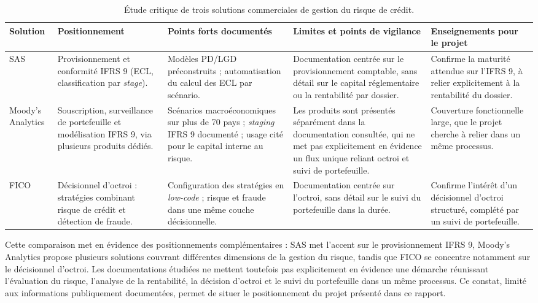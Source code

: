 \begin{table}[htbp]
    \centering
    \footnotesize
    \caption{Étude critique de trois solutions commerciales de gestion du risque de crédit.}
    \label{tab:etude-existant}
    \begin{tabular}{p{1.8cm}p{2.7cm}p{3cm}p{3.5cm}p{3.3cm}}
        \toprule
        \textbf{Solution} & \textbf{Positionnement} & \textbf{Points forts documentés} & \textbf{Limites et points de vigilance} & \textbf{Enseignements pour le projet} \\
        \midrule
        SAS \parencite{SASIFRS9} &
        Provisionnement et conformité IFRS 9 (ECL, classification par \emph{stage}). &
        Modèles PD/LGD préconstruits ; automatisation du calcul des ECL par scénario. &
        Documentation centrée sur le provisionnement comptable, sans détail sur le capital réglementaire ou la rentabilité par dossier. &
        Confirme la maturité attendue sur l'IFRS 9, à relier explicitement à la rentabilité du dossier. \\
        \addlinespace
        Moody's Analytics \parencite{MoodysIFRS9} &
        Souscription, surveillance de portefeuille et modélisation IFRS 9, via plusieurs produits dédiés. &
        Scénarios macroéconomiques sur plus de 70 pays ; \emph{staging} IFRS 9 documenté ; usage cité pour le capital interne au risque. &
        Les produits sont présentés séparément dans la documentation consultée, qui ne met pas explicitement en évidence un flux unique reliant octroi et suivi de portefeuille. &
        Couverture fonctionnelle large, que le projet cherche à relier dans un même processus. \\
        \addlinespace
        FICO \parencite{FICOOriginations} &
        Décisionnel d'octroi : stratégies combinant risque de crédit et détection de fraude. &
        Configuration des stratégies en \emph{low-code} ; risque et fraude dans une même couche décisionnelle. &
        Documentation centrée sur l'octroi, sans détail sur le suivi du portefeuille dans la durée. &
        Confirme l'intérêt d'un décisionnel d'octroi structuré, complété par un suivi de portefeuille. \\
        \bottomrule
    \end{tabular}
\end{table}

Cette comparaison met en évidence des positionnements complémentaires : SAS met l'accent sur le provisionnement IFRS 9, Moody's Analytics propose plusieurs solutions couvrant différentes dimensions de la gestion du risque, tandis que FICO se concentre notamment sur le décisionnel d'octroi. Les documentations étudiées ne mettent toutefois pas explicitement en évidence une démarche réunissant l'évaluation du risque, l'analyse de la rentabilité, la décision d'octroi et le suivi du portefeuille dans un même processus. Ce constat, limité aux informations publiquement documentées, permet de situer le positionnement du projet présenté dans ce rapport.

